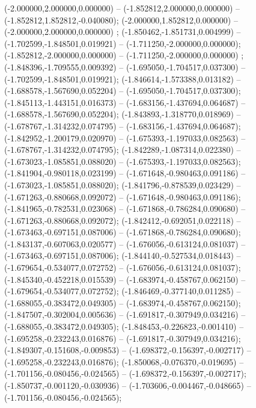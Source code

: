  (-2.000000,2.000000,0.000000) -- (-1.852812,2.000000,0.000000) -- (-1.852812,1.852812,-0.040080);
 (-2.000000,1.852812,0.000000) -- (-2.000000,2.000000,0.000000) ;
 (-1.850462,-1.851731,0.004999) -- (-1.702599,-1.848501,0.019921) -- (-1.711250,-2.000000,0.000000);
 (-1.852812,-2.000000,0.000000) -- (-1.711250,-2.000000,0.000000) ;
 (-1.848396,-1.709555,0.009392) -- (-1.695050,-1.704517,0.037300) -- (-1.702599,-1.848501,0.019921);
 (-1.846614,-1.573388,0.013182) -- (-1.688578,-1.567690,0.052204) -- (-1.695050,-1.704517,0.037300);
 (-1.845113,-1.443151,0.016373) -- (-1.683156,-1.437694,0.064687) -- (-1.688578,-1.567690,0.052204);
 (-1.843893,-1.318770,0.018969) -- (-1.678767,-1.314232,0.074795) -- (-1.683156,-1.437694,0.064687);
 (-1.842952,-1.200179,0.020970) -- (-1.675393,-1.197033,0.082563) -- (-1.678767,-1.314232,0.074795);
 (-1.842289,-1.087314,0.022380) -- (-1.673023,-1.085851,0.088020) -- (-1.675393,-1.197033,0.082563);
 (-1.841904,-0.980118,0.023199) -- (-1.671648,-0.980463,0.091186) -- (-1.673023,-1.085851,0.088020);
 (-1.841796,-0.878539,0.023429) -- (-1.671263,-0.880668,0.092072) -- (-1.671648,-0.980463,0.091186);
 (-1.841965,-0.782531,0.023068) -- (-1.671868,-0.786284,0.090680) -- (-1.671263,-0.880668,0.092072);
 (-1.842412,-0.692051,0.022118) -- (-1.673463,-0.697151,0.087006) -- (-1.671868,-0.786284,0.090680);
 (-1.843137,-0.607063,0.020577) -- (-1.676056,-0.613124,0.081037) -- (-1.673463,-0.697151,0.087006);
 (-1.844140,-0.527534,0.018443) -- (-1.679654,-0.534077,0.072752) -- (-1.676056,-0.613124,0.081037);
 (-1.845340,-0.452218,0.015539) -- (-1.683974,-0.458767,0.062150) -- (-1.679654,-0.534077,0.072752);
 (-1.846469,-0.377140,0.011285) -- (-1.688055,-0.383472,0.049305) -- (-1.683974,-0.458767,0.062150);
 (-1.847507,-0.302004,0.005636) -- (-1.691817,-0.307949,0.034216) -- (-1.688055,-0.383472,0.049305);
 (-1.848453,-0.226823,-0.001410) -- (-1.695258,-0.232243,0.016876) -- (-1.691817,-0.307949,0.034216);
 (-1.849307,-0.151608,-0.009853) -- (-1.698372,-0.156397,-0.002717) -- (-1.695258,-0.232243,0.016876);
 (-1.850068,-0.076370,-0.019695) -- (-1.701156,-0.080456,-0.024565) -- (-1.698372,-0.156397,-0.002717);
 (-1.850737,-0.001120,-0.030936) -- (-1.703606,-0.004467,-0.048665) -- (-1.701156,-0.080456,-0.024565);
